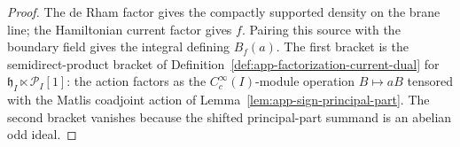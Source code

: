 \begin{proof}
  The de Rham factor gives the compactly supported density on the
  brane line; the Hamiltonian current factor gives \(f\).  Pairing
  this source with the boundary field gives the integral defining
  \(B_f(a)\).  The first bracket is the semidirect-product bracket of
  Definition~\ref{def:app-factorization-current-dual} for
  \(\mathfrak h_I\ltimes\mathcal P_I[1]\): the action factors as the
  \(C_c^\infty(I)\)-module operation \(B\mapsto aB\) tensored with
  the Matlis coadjoint action of
  Lemma~\ref{lem:app-sign-principal-part}.  The second bracket
  vanishes because the shifted principal-part summand is an abelian
  odd ideal.
\end{proof}
